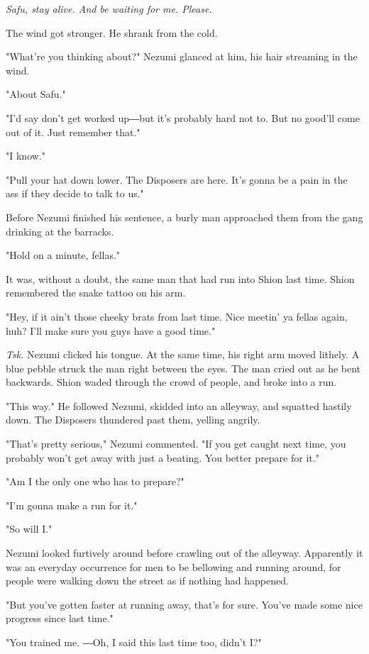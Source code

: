 \emph{Safu, stay alive. And be waiting for me. Please.}

The wind got stronger. He shrank from the cold.

"What're you thinking about?" Nezumi glanced at him, his hair streaming
in the wind.

"About Safu."

"I'd say don't get worked up―but it's probably hard not to. But no
good'll come out of it. Just remember that."

"I know."

"Pull your hat down lower. The Disposers are here. It's gonna be a pain
in the ass if they decide to talk to us."

Before Nezumi finished his sentence, a burly man approached them from
the gang drinking at the barracks.

"Hold on a minute, fellas."

It was, without a doubt, the same man that had run into Shion last time.
Shion remembered the snake tattoo on his arm.

"Hey, if it ain't those cheeky brats from last time. Nice meetin' ya
fellas again, huh? I'll make sure you guys have a good time."

\emph{Tsk.} Nezumi clicked his tongue. At the same time, his right arm moved
lithely. A blue pebble struck the man right between the eyes. The man
cried out as he bent backwards. Shion waded through the crowd of people,
and broke into a run.

"This way." He followed Nezumi, skidded into an alleyway, and squatted
hastily down. The Disposers thundered past them, yelling angrily.

"That's pretty serious," Nezumi commented. "If you get caught next time,
you probably won't get away with just a beating. You better prepare for
it."

"Am I the only one who has to prepare?"

"I'm gonna make a run for it."

"So will I."

Nezumi looked furtively around before crawling out of the alleyway.
Apparently it was an everyday occurrence for men to be bellowing and
running around, for people were walking down the street as if nothing
had happened.

"But you've gotten faster at running away, that's for sure. You've made
some nice progress since last time."

"You trained me. ―Oh, I said this last time too, didn't I?"

